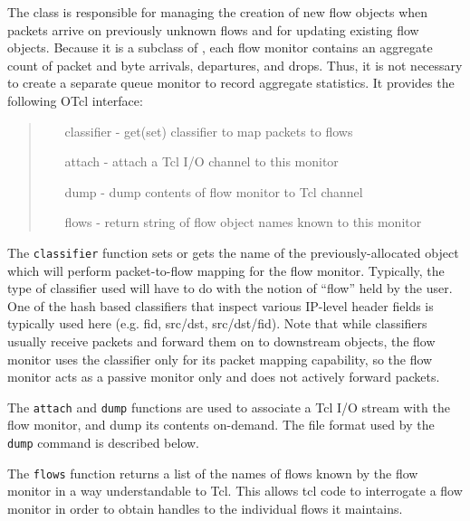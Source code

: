 The  class is responsible for managing
the creation of new flow objects when packets arrive on previously
unknown flows and for updating existing flow objects.
Because it is a subclass of , each flow monitor
contains an aggregate count of packet and byte arrivals, departures, and
drops.
Thus, it is not necessary to create a separate queue monitor to record
aggregate statistics.
It provides the following OTcl interface:
\begin{quote}
\begin{itemize}
	\item[classifier] - get(set) classifier to map packets to flows
	\item[attach] - attach a Tcl I/O channel to this monitor
	\item[dump] - dump contents of flow monitor to Tcl channel
	\item[flows] - return string of flow object names known to this monitor
\end{itemize}
\end{quote}

The {\tt classifier} function sets or gets the name of the previously-allocated
object which will perform packet-to-flow mapping for the flow monitor.
Typically, the type of classifier used will have to do with the notion of
``flow'' held by the user.
One of the hash based classifiers that inspect various IP-level header
fields is typically used here (e.g. fid, src/dst, src/dst/fid).
Note that while classifiers usually receive packets and forward them
on to downstream objects, the flow monitor uses the classifier only for
its packet mapping capability, so the flow monitor acts as a passive
monitor only and does not actively forward packets.

The {\tt attach} and {\tt dump} functions are used to
associate a Tcl I/O stream with the
flow monitor, and dump its contents on-demand.
The file format used by the {\tt dump} command is described below.

The {\tt flows} function returns a list of the names of flows known
by the flow monitor in a way understandable to Tcl.
This allows tcl code to interrogate a flow monitor in order
to obtain handles to the individual flows it maintains.

\subsubsection{}

